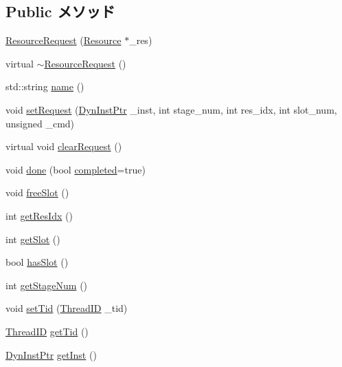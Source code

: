 \subsection*{Public メソッド}
\begin{DoxyCompactItemize}
\item 
\hyperlink{classResourceRequest_ab5c79728c63623d1e0ede405fab39439}{ResourceRequest} (\hyperlink{classResource}{Resource} $\ast$\_\-res)
\item 
virtual \hyperlink{classResourceRequest_abd2569049d4e7c629ea3850d1878f00e}{$\sim$ResourceRequest} ()
\item 
std::string \hyperlink{classResourceRequest_af1801e31af6399bccce114ab12575168}{name} ()
\item 
void \hyperlink{classResourceRequest_a119047fd563fe0c2e38e62dfb3be1dac}{setRequest} (\hyperlink{classRefCountingPtr}{DynInstPtr} \_\-inst, int stage\_\-num, int res\_\-idx, int slot\_\-num, unsigned \_\-cmd)
\item 
virtual void \hyperlink{classResourceRequest_ace5d1d4025bbb180364fdcb74e7a7c57}{clearRequest} ()
\item 
void \hyperlink{classResourceRequest_a2a9dd8aec142709a08d9a73f37668427}{done} (bool \hyperlink{classResourceRequest_a8c06e370b709d689e392a4b7b53b47c5}{completed}=true)
\item 
void \hyperlink{classResourceRequest_a56a88e585d03dc018d319923f9f8ce70}{freeSlot} ()
\item 
int \hyperlink{classResourceRequest_a86a16ad39036a0cf078dcf2d96455c38}{getResIdx} ()
\item 
int \hyperlink{classResourceRequest_aa3dcf920f4d17ee3b6baf56b80de49b8}{getSlot} ()
\item 
bool \hyperlink{classResourceRequest_a530bf162e1dfd48345fbadb377fe6dc4}{hasSlot} ()
\item 
int \hyperlink{classResourceRequest_a23f98e01fefe4f9932dab663601fc371}{getStageNum} ()
\item 
void \hyperlink{classResourceRequest_a15517d4cd5ca229f6b178308b037e44a}{setTid} (\hyperlink{base_2types_8hh_ab39b1a4f9dad884694c7a74ed69e6a6b}{ThreadID} \_\-tid)
\item 
\hyperlink{base_2types_8hh_ab39b1a4f9dad884694c7a74ed69e6a6b}{ThreadID} \hyperlink{classResourceRequest_ae23cdeee3f028eb29f1fd13002a9845c}{getTid} ()
\item 
\hyperlink{classRefCountingPtr}{DynInstPtr} \hyperlink{classResourceRequest_af6db09c48a5520b022682b3f32ff771c}{getInst} ()
\item 

\end{DoxyCompactItemize}
